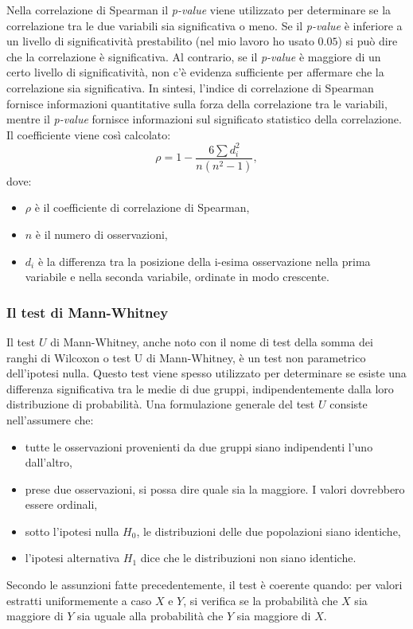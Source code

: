 \documentclass[12pt,italian]{report}
\begin{document}
	Nella correlazione di Spearman il \textit{p-value} viene utilizzato per determinare se la correlazione tra le due variabili sia significativa o meno. Se il \textit{p-value} è inferiore a un livello di significatività prestabilito (nel mio lavoro ho usato $0.05$) si può dire che la correlazione è significativa.  Al contrario, se il \textit{p-value} è maggiore di un certo livello di significatività, non c'è evidenza sufficiente per affermare che la correlazione sia significativa. In sintesi, l'indice di correlazione di Spearman fornisce informazioni quantitative sulla forza della correlazione tra le variabili, mentre il \textit{p-value} fornisce informazioni sul significato statistico della correlazione.
	Il coefficiente viene così calcolato:
	\begin{equation}
		\rho = 1 - \frac{6 \sum d_i^2}{n(n^2 - 1)},
	\end{equation}
	dove:
	\begin{itemize}
		\item $\rho$ è il coefficiente di correlazione di Spearman,
		\item $n$ è il numero di osservazioni,
		\item $d_i$ è la differenza tra la posizione della i-esima osservazione nella prima variabile e nella seconda variabile, ordinate in modo crescente.
	\end{itemize}

	
	\subsubsection{Il test di Mann-Whitney}
	\label{Mannwhitney}
	Il test $U$ di Mann-Whitney, anche noto con il nome di test della somma dei ranghi di Wilcoxon o test U di Mann-Whitney, è un test non parametrico dell'ipotesi nulla. Questo test viene spesso utilizzato per determinare se esiste una differenza significativa tra le medie di due gruppi, indipendentemente dalla loro distribuzione di probabilità.
	Una formulazione generale del test $U$ consiste nell'assumere che:
	\begin{itemize}
		\item tutte le osservazioni provenienti da due gruppi siano indipendenti l'uno dall'altro,
		\item prese due osservazioni, si possa dire quale sia la maggiore. I valori dovrebbero essere ordinali,
		\item sotto l'ipotesi nulla $H_0$, le distribuzioni delle due popolazioni siano identiche,
		\item l'ipotesi alternativa $H_1$ dice che le distribuzioni non siano identiche.
	\end{itemize}
	Secondo le assunzioni fatte precedentemente, il test è coerente quando: per valori estratti uniformemente a caso $X$ e $Y$, si verifica se la probabilità che $X$ sia maggiore di $Y$ sia uguale alla probabilità che $Y$ sia maggiore di $X$.  
	
\end{document}
